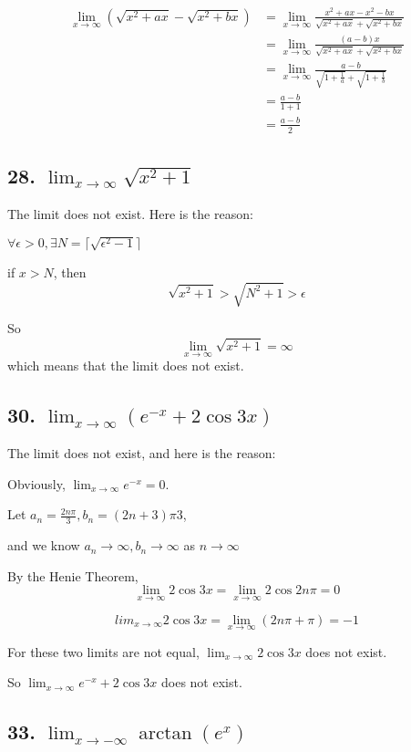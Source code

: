 \documentclass{article}
\begin{document}
    $$
    \begin{aligned}
        \lim_{x \to \infty}(\sqrt{x^2 + ax} - \sqrt{x^2 + bx}) &= \lim_{x \to \infty}\frac{x^2 + ax - x^2 - bx}{\sqrt{x^2 + ax} + \sqrt{x^2 + bx}} \\
        &= \lim_{x \to \infty}\frac{(a-b)x}{\sqrt{x^2 + ax} + \sqrt{x^2 + bx}} \\
        &= \lim_{x \to \infty}\frac{a - b}{\sqrt{1 + \frac 1 a} + \sqrt{1 + \frac 1 b}} \\
        &= \frac{a - b}{1 + 1} \\
        &= \frac{a - b}{2}
    \end{aligned}
    $$

    \subsection*{28. $\lim_{x \to \infty}\sqrt{x^2 + 1}$}

    The limit does not exist. Here is the reason:

    $\forall \epsilon > 0, \exists N = \lceil \sqrt{\epsilon ^2 - 1} \rceil$

    if $ x > N$, then $$\sqrt{x^2 + 1} > \sqrt{N^2 + 1} > \epsilon$$

    So $$\lim_{x \to \infty}\sqrt{x ^2 + 1} = \infty$$ which means that the limit does not exist.

    \subsection*{30. $\lim_{x \to \infty}(e^{-x} + 2 \cos 3x)$}

    The limit does not exist, and here is the reason:

    Obviously, $\lim_{x \to \infty}e^{-x} = 0$.

    Let $a_n = \frac{2n\pi}{3}, b_n = {(2n + 3)\pi}{3}$,

    and we know $a_n \to \infty, b_n \to \infty$ as $n \to \infty$

    By the Henie Theorem, $$\lim_{x \to \infty}2\cos 3x = \lim_{x \to \infty}2 \cos 2n \pi = 0$$

    $$lim_{x \to \infty}2\cos 3x = \lim_{x \to \infty}(2n\pi + \pi) = -1$$

    For these two limits are not equal, $\lim_{x \to \infty}2\cos 3x$ does not exist.

    So $\lim_{x \to \infty}{e^{-x} + 2 \cos 3x}$ does not exist.

    \subsection*{33. $\lim_{x \to -\infty}\arctan(e^x)$}
\end{document}
